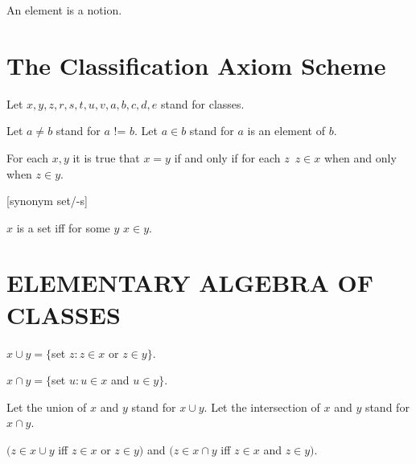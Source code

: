 \documentclass[a4paper,draft]{amsproc}
\begin{document}
\begin{forthel}

\begin{signature}[ElmSort]
An element is a notion.
\end{signature}

\section{The Classification Axiom Scheme}

Let $x, y, z, r, s, t, u, v, a, b, c, d, e$ stand for classes.

Let $a \neq b$ stand for $a$ != $b$.
Let $a \in b$ stand for $a$ is an element of $b$.

\begin{axiom} For each $x, y$  
it is true that $x = y$ if and only if for each $z$\ $z \in x$ 
when and only when $z \in y$.
\end{axiom}


[synonym set/-s]

\begin{definition} 
$x$ is a set iff for some $y$ $x \in y$.
\end{definition}

\section{ELEMENTARY ALGEBRA OF CLASSES}

\begin{definition} 
$x \cup y = \{$set $z : z \in x$ or $z \in y \}$.
\end{definition}

\begin{definition} 
$x \cap y = \{$set $u : u \in x$ and $u \in y \}$.
\end{definition}

Let the union of $x$ and $y$ stand for $x \cup y$.
Let the intersection of $x$ and $y$ stand for $x \cap y$.

\begin{theorem}
$(z \in x \cup y$ iff $z \in x$ or $z \in y)$
and $(z \in x \cap y$ iff $z \in x$ and $z \in y)$.
\end{theorem}


\end{forthel}
\end{document}

